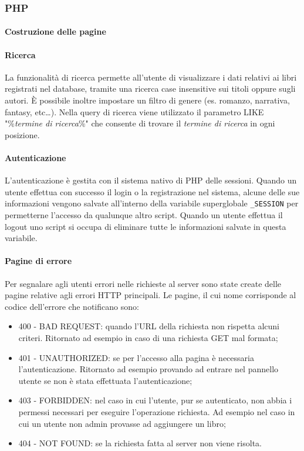 \documentclass[12pt,a4paper,headings=optiontohead]{article}
\begin{document}
	\subsubsection{PHP}
	\paragraph{Costruzione delle pagine} %
	
	\paragraph{Ricerca}
	La funzionalità di ricerca permette all'utente di visualizzare i dati relativi ai libri registrati nel database, tramite una ricerca case insensitive sui titoli oppure sugli autori. È possibile inoltre impostare un filtro di genere (es. romanzo, narrativa, fantasy, etc\dots). Nella query di ricerca viene utilizzato il parametro LIKE "\%\textit{termine di ricerca}\%" che consente di trovare il \textit{termine di ricerca} in ogni posizione.
	
	\paragraph{Autenticazione}
	L'autenticazione è gestita con il sistema nativo di PHP delle sessioni. Quando un utente effettua con successo il login o la registrazione nel sistema, alcune delle sue informazioni vengono salvate all'interno della variabile superglobale \texttt{\_SESSION} per permetterne l'accesso da qualunque altro script. Quando un utente effettua il logout uno script si occupa di eliminare tutte le informazioni salvate in questa variabile. 
	
	\paragraph{Pagine di errore} %
	Per segnalare agli utenti errori nelle richieste al server sono state create delle pagine relative agli errori HTTP principali. Le pagine, il cui nome corrisponde al codice dell'errore che notificano sono:
	\begin{itemize}
		\item 400 - BAD REQUEST: quando l'URL della richiesta non rispetta alcuni criteri. Ritornato ad esempio in caso di una richiesta GET mal formata;
		\item 401 - UNAUTHORIZED: se per l'accesso alla pagina è necessaria l'autenticazione. Ritornato ad esempio provando ad entrare nel pannello utente se non è stata effettuata l'autenticazione;
		\item 403 - FORBIDDEN: nel caso in cui l'utente, pur se autenticato, non abbia i permessi necessari per eseguire l'operazione richiesta. Ad esempio nel caso in cui un utente non admin provasse ad aggiungere un libro;
		\item 404 - NOT FOUND: se la richiesta fatta al server non viene risolta.
	\end{itemize}
	
\end{document}
